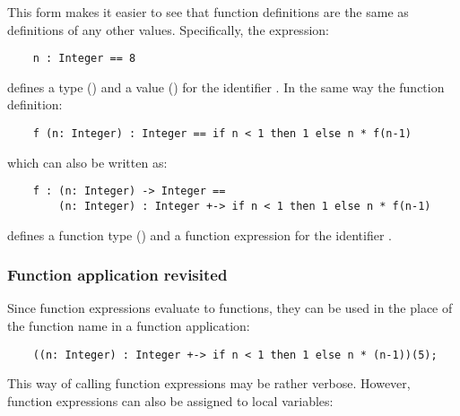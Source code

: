 This form makes it easier to see that function definitions are the same
as definitions of any other values.  Specifically, the expression:

\begin{small}
\begin{verbatim}
    n : Integer == 8
\end{verbatim}
\end{small}

defines a type () and a value () for the identifier
.  In the same way the function definition:

\begin{small}
\begin{verbatim}
    f (n: Integer) : Integer == if n < 1 then 1 else n * f(n-1)
\end{verbatim}
\end{small}

which can also be written as:

\begin{small}
\begin{verbatim}
    f : (n: Integer) -> Integer ==
        (n: Integer) : Integer +-> if n < 1 then 1 else n * f(n-1)
\end{verbatim}
\end{small}

defines a function type () and
a function expression for the identifier .

\subsubsection{Function application revisited}

Since function expressions evaluate to functions, they can be used
in the place of the function name in a function application:

\begin{small}
\begin{verbatim}
    ((n: Integer) : Integer +-> if n < 1 then 1 else n * (n-1))(5);
\end{verbatim}
\end{small}

This way of calling function expressions may be rather verbose. However,
function expressions can also be assigned to local variables:

